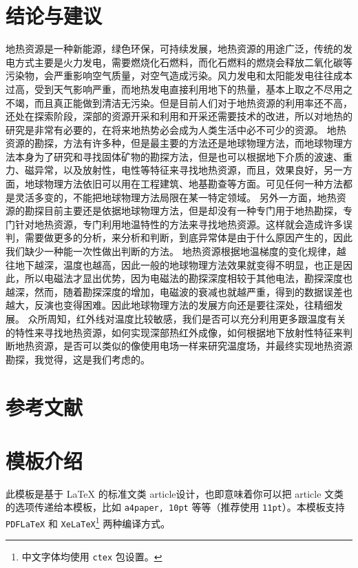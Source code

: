 \documentclass[lang=cn,11pt]{elegantpaper}
\begin{document}
\section{结论与建议}
地热资源是一种新能源，绿色环保，可持续发展，地热资源的用途广泛，传统的发电方式主要是火力发电，需要燃烧化石燃料，而化石燃料的燃烧会释放二氧化碳等污染物，会严重影响空气质量，对空气造成污染。风力发电和太阳能发电往往成本过高，受到天气影响严重，而地热发电直接利用地下的热量，基本上取之不尽用之不竭，而且真正能做到清洁无污染。但是目前人们对于地热资源的利用率还不高，还处在探索阶段，深部的资源开采和利用和开采还需要技术的改进，所以对地热的研究是非常有必要的，在将来地热势必会成为人类生活中必不可少的资源。
地热资源的勘探，方法有许多种，但是最主要的方法还是地球物理方法，而地球物理方法本身为了研究和寻找固体矿物的勘探方法，但是也可以根据地下介质的波速、重力、磁异常，以及放射性，电性等特征来寻找地热资源，而且，效果良好，另一方面，地球物理方法依旧可以用在工程建筑、地基勘查等方面。可见任何一种方法都是灵活多变的，不能把地球物理方法局限在某一特定领域。
另外一方面，地热资源的勘探目前主要还是依据地球物理方法，但是却没有一种专门用于地热勘探，专门针对地热资源，专门利用地温特性的方法来寻找地热资源。这样就会造成许多误判，需要做更多的分析，来分析和判断，到底异常体是由于什么原因产生的，因此我们缺少一种能一次性做出判断的方法。
地热资源根据地温梯度的变化规律，越往地下越深，温度也越高，因此一般的地球物理方法效果就变得不明显，也正是因此，所以电磁法才显出优势，因为电磁法的勘探深度相较于其他电法，勘探深度也越深，然而，随着勘探深度的增加，电磁波的衰减也就越严重，得到的数据误差也越大，反演也变得困难。因此地球物理方法的发展方向还是要往深处，往精细发展。
众所周知，红外线对温度比较敏感，我们是否可以充分利用更多跟温度有关的特性来寻找地热资源，如何实现深部热红外成像，如何根据地下放射性特征来判断地热资源，是否可以类似的像使用电场一样来研究温度场，并最终实现地热资源勘探，我觉得，这是我们考虑的。

\section{参考文献}
\nocite {*}

\section{模板介绍}
此模板是基于 \LaTeX{} 的标准文类 article设计，也即意味着你可以把 article 文类的选项传递给本模板，比如 \lstinline{a4paper, 10pt} 等等（推荐使用 \lstinline{11pt}）。本模板支持 \lstinline{PDFLaTeX} 和 \lstinline{XeLaTeX}\footnote{中文字体均使用 \lstinline{ctex} 包设置。} 两种编译方式。
\end{document}
